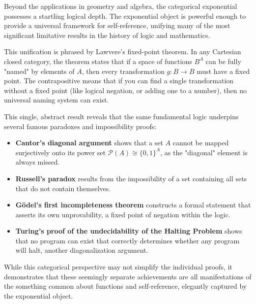 \begin{tcolorbox}[
  colback=gray!5,
  colframe=gray!50,
  boxrule=0.5pt,
  arc=2pt,
  left=10pt,
  right=10pt,
  top=10pt,
  bottom=10pt,
  title={\centering\large\textbf{Lawvere's Fixed-Point Theorem and the Limits of Self-Reference}}
]

Beyond the applications in geometry and algebra, the categorical exponential possesses a startling logical depth. The exponential object is powerful enough to provide a universal framework for self-reference, unifying many of the most significant limitative results in the history of logic and mathematics. \par

This unification is phrased by Lawvere's fixed-point theorem. In any Cartesian closed category, the theorem states that if a space of functions $B^A$ can be fully "named" by elements of $A$, then every transformation $g: B \to B$ must have a fixed point. The contrapositive means that if you can find a single transformation without a fixed point (like logical negation, or adding one to a number), then no universal naming system can exist. \par

This single, abstract result reveals that the same fundamental logic underpins several famous paradoxes and impossibility proofs:

\begin{itemize}[leftmargin=*,itemsep=3pt]
\item \textbf{Cantor's diagonal argument} shows that a set $A$ cannot be mapped surjectively onto its power set $\mathcal{P}(A) \cong \{0, 1\}^A$, as the "diagonal" element is always missed.

\item \textbf{Russell's paradox} results from the impossibility of a set containing all sets that do not contain themselves.

\item \textbf{Gödel's first incompleteness theorem} constructs a formal statement that asserts its own unprovability, a fixed point of negation within the logic.

\item \textbf{Turing's proof of the undecidability of the Halting Problem} shows that no program can exist that correctly determines whether any program will halt, another diagonalization argument. \par
\end{itemize}

While this categorical perspective may not simplify the individual proofs, it demonstrates that these seemingly separate achievements are all manifestations of the something common about functions and self-reference, elegantly captured by the exponential object.

\end{tcolorbox}

